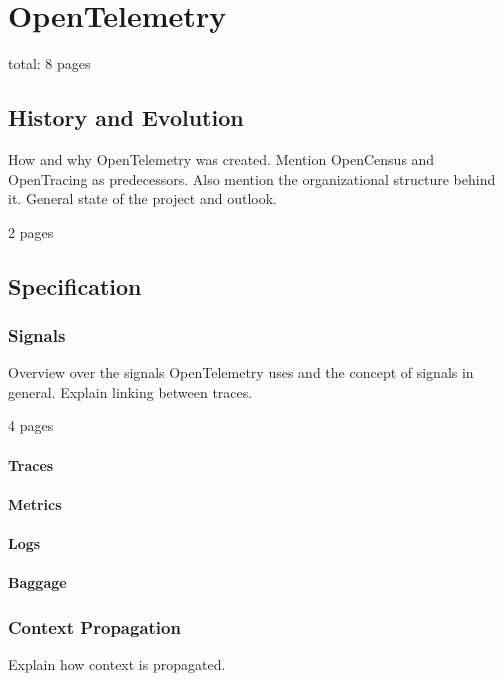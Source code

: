 \chapter{OpenTelemetry}
\label{chap:opentelemetry}

total: 8 pages

\section{History and Evolution}
\label{sec:o_history_and_evolution}

How and why OpenTelemetry was created. Mention OpenCensus and OpenTracing as predecessors.
Also mention the organizational structure behind it.
General state of the project and outlook.

2 pages

\section{Specification}
\label{sec:o_specification}

\subsection{Signals}

Overview over the signals OpenTelemetry uses and the concept of signals in general. Explain linking between traces.

4 pages

\subsubsection{Traces}
\subsubsection{Metrics}
\subsubsection{Logs}
\subsubsection{Baggage}

\subsection{Context Propagation}

Explain how context is propagated.

